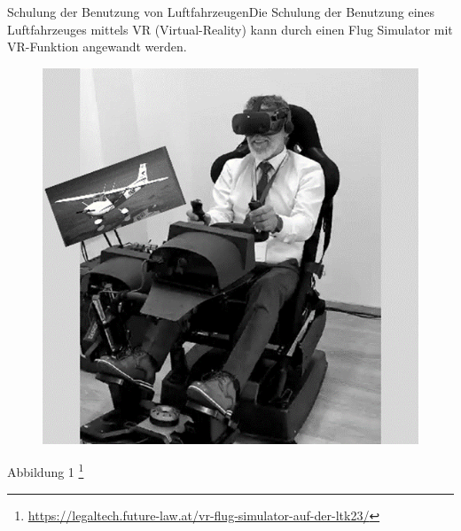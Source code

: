 Schulung der Benutzung von LuftfahrzeugenDie Schulung der Benutzung eines Luftfahrzeuges mittels VR (Virtual-Reality) kann durch einen Flug Simulator mit VR-Funktion angewandt werden.
\begin{figure}[!ht]
    \centering
    \includegraphics[width=1.0\textwidth]{images/Abbildung 1.png}
    \caption{\label{fig:Abbildung 1}\protect
    }
\end{figure}
Abbildung 1 \footnote{\url{https://legaltech.future-law.at/vr-flug-simulator-auf-der-ltk23/}}
